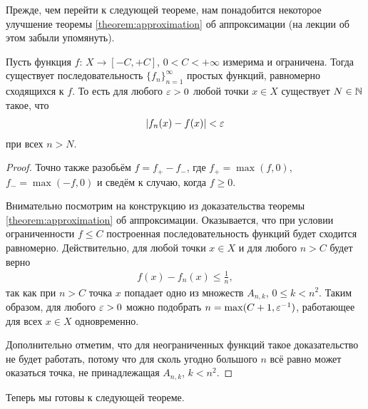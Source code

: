 Прежде, чем перейти к следующей теореме, нам понадобится некоторое улучшение теоремы \ref{theorem:approximation} об аппроксимации (на лекции об этом забыли упомянуть).

\begin{thm}
\label{theorem:uniform_approximation}

Пусть функция $f \colon\, X \to [-C, +C] $, $0 < C < +\infty$  измерима и ограничена. Тогда существует последовательность $\{f_{n}\}_{n=1}^{\infty} $ простых функций, равномерно сходящихся к $f$. То есть для любого $\varepsilon > 0$ любой точки $x \in X$ существует $N \in \mathbb{N}$ такое, что \begin{align*}
 \left| f_n(x) - f(x) \right| < \varepsilon
\end{align*} при всех $n > N$.
\end{thm}
\begin{proof}
 Точно также разобьём $f = f_+ - f_-$, где $f_+ = \max(f,0)$, $f_- = \max(-f, 0)$ и сведём к случаю, когда $f \geqslant 0$.

 Внимательно посмотрим на конструкцию из доказательства теоремы \ref{theorem:approximation} об аппроксимации. Оказывается, что при условии ограниченности $f \leqslant C$ построенная последовательность функций будет сходится равномерно. Действительно, для любой точки $x \in X$ и для любого $n > C$ будет верно \begin{align*}
  f(x) - f_n(x) \leqslant \frac{1}{n}
 ,\end{align*} так как при $n > C$ точка $x$ попадает одно из множеств $A_{n,k}$, $0 \leqslant k < n^{2}$. Таким образом, для любого $\varepsilon > 0$ можно подобрать $n = \max(C + 1, \varepsilon^{-1})$, работающее для всех $x \in X$ одновременно.

 Дополнительно отметим, что для неограниченных функций такое доказательство не будет работать, потому что для сколь угодно большого $n$ всё равно может оказаться точка, не принадлежащая $A_{n,k}$, $k < n^{2}$.
\end{proof}

Теперь мы готовы к следующей теореме.

